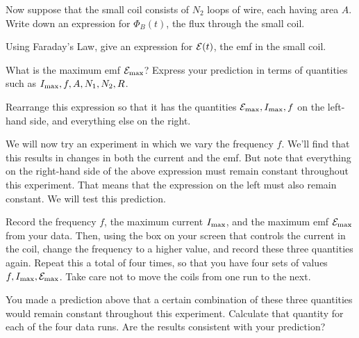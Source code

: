 \vskip 1in

Now suppose that the small coil consists of $N_2$ loops of wire,
each having area $A$.  Write down an expression for $\Phi_B(t)$, the
flux through the small coil.

\vskip 1in

Using Faraday's Law, give an expression for ${\cal E}(t)$, the emf in
the small coil.

\vskip 1.5in

What is the maximum emf ${\cal E}_{\rm max}$?  Express your prediction
in terms of quantities such as $I_{\rm max},f,A,N_1,N_2,R$.

\newpage

\vskip 1in

Rearrange this expression so that it has the quantities ${\cal E}_{\rm max},
I_{\rm max},f$ on the left-hand side, and everything else on the right.


\vskip 1in

We will now try an experiment in which we vary the frequency $f$.  We'll
find that this results in changes in both the current and the emf.
But note that everything on the right-hand side of the above expression
must remain constant throughout this experiment.  That
means that the expression on the left must also remain
constant.  We will test this prediction.

Record the frequency $f$, the maximum current $I_{\rm max}$, and the
maximum emf ${\cal E}_{\rm max}$ from your data.
Then, using the box on your screen that controls the 
current in the coil, change the frequency to a higher value,
and record these three quantities again.  Repeat this a total of four
times, so that you have four sets of values $f,I_{\rm max},{\cal E}_{\rm max}$.
Take care not to move the coils from one run to the next.


\vskip 2.5in

You made a prediction above that a certain combination of these
three quantities would remain constant throughout this experiment.
Calculate that quantity for each of the four data runs.  Are the
results consistent with your prediction?

\vskip 2in


\newpage

